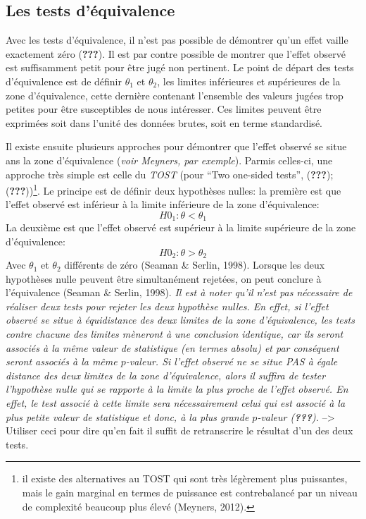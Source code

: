 \documentclass[
  english,
  man]{apa6}
\begin{document}
\hypertarget{les-tests-duxe9quivalence}{%
\subsection{Les tests d'équivalence}\label{les-tests-duxe9quivalence}}

Avec les tests d'équivalence, il n'est pas possible de démontrer qu'un effet vaille exactement zéro ({\textbf{???}}). Il est par contre possible de montrer que l'effet observé est suffisamment petit pour être jugé non pertinent. Le point de départ des tests d'équivalence est de définir \(\theta_1\) et \(\theta_2\), les limites inférieures et supérieures de la zone d'équivalence, cette dernière contenant l'ensemble des valeurs jugées trop petites pour être susceptibles de nous intéresser. Ces limites peuvent être exprimées soit dans l'unité des données brutes, soit en terme standardisé.

Il existe ensuite plusieurs approches pour démontrer que l'effet observé se situe ans la zone d'équivalence (\emph{voir Meyners, par exemple}). Parmis celles-ci, une approche très simple est celle du \emph{TOST} (pour \enquote{Two one-sided tests}, ({\textbf{???}}); ({\textbf{???}}))\footnote{il existe des alternatives au TOST qui sont très légèrement plus puissantes, mais le gain marginal en termes de puissance est contrebalancé par un niveau de complexité beaucoup plus élevé (Meyners, 2012).}. Le principe est de définir deux hypothèses nulles: la première est que l'effet observé est inférieur à la limite inférieure de la zone d'équivalence: \[H0_1: \theta < \theta_1\] La deuxième est que l'effet observé est supérieur à la limite supérieure de la zone d'équivalence: \[H0_2: \theta > \theta_2\] Avec \(\theta_1\) et \(\theta_2\) différents de zéro (Seaman \& Serlin, 1998). Lorsque les deux hypothèses nulle peuvent être simultanément rejetées, on peut conclure à l'équivalence (Seaman \& Serlin, 1998). \emph{Il est à noter qu'il n'est pas nécessaire de réaliser deux tests pour rejeter les deux hypothèse nulles. En effet, si l'effet observé se situe à équidistance des deux limites de la zone d'équivalence, les tests contre chacune des limites mèneront à une conclusion identique, car ils seront associés à la même valeur de statistique (en termes absolu) et par conséquent seront associés à la même \(p\)-valeur. Si l'effet observé ne se situe PAS à égale distance des deux limites de la zone d'équivalence, alors il suffira de tester l'hypothèse nulle qui se rapporte à la limite la plus proche de l'effet observé. En effet, le test associé à cette limite sera nécessairement celui qui est associé à la plus petite valeur de statistique et donc, à la plus grande \(p\)-valeur ({\textbf{???}}).} --\textgreater{} Utiliser ceci pour dire qu'en fait il suffit de retranscrire le résultat d'un des deux tests.
\end{document}
